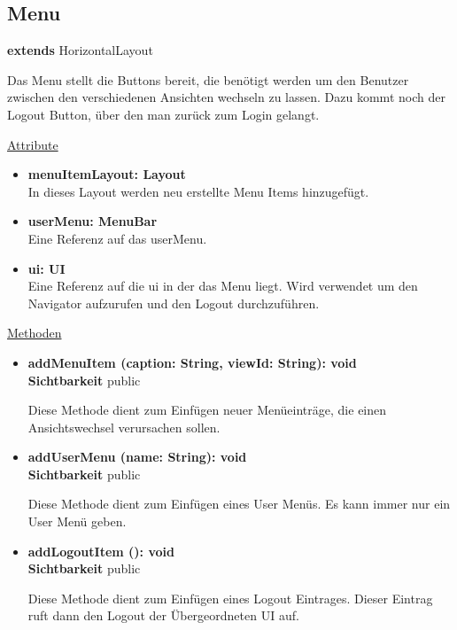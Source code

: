 \newpage
\subsection{Menu}
\textbf{extends}  HorizontalLayout \newline

Das Menu stellt die Buttons bereit, die benötigt werden um den Benutzer zwischen den verschiedenen Ansichten wechseln zu lassen. Dazu kommt noch der Logout Button, über den man zurück zum Login gelangt.
\newline

\underline{Attribute}
\begin{itemize}
\itemsep0pt

\item \textbf{menuItemLayout: Layout} \hfill\\ 
In dieses Layout werden neu erstellte Menu Items hinzugefügt.

\item \textbf{userMenu: MenuBar} \hfill\\ 
Eine Referenz auf das userMenu.

\item \textbf{ui: UI} \hfill\\ 
Eine Referenz auf die ui in der das Menu liegt. Wird verwendet um den Navigator aufzurufen und den Logout durchzuführen.

\end{itemize}

\underline{Methoden}
\begin{itemize}
\itemsep0pt
\item \textbf{addMenuItem (caption: String, viewId: String): void}\hfill\\
\textbf{Sichtbarkeit} public

Diese Methode dient zum Einfügen neuer Menüeinträge, die einen Ansichtswechsel verursachen sollen.

\item \textbf{addUserMenu (name: String): void}\hfill\\
\textbf{Sichtbarkeit} public

Diese Methode dient zum Einfügen eines User Menüs. Es kann immer nur ein User Menü geben.

\item \textbf{addLogoutItem (): void}\hfill\\
\textbf{Sichtbarkeit} public

Diese Methode dient zum Einfügen eines Logout Eintrages. Dieser Eintrag ruft dann den Logout der Übergeordneten UI auf.

\end{itemize}
